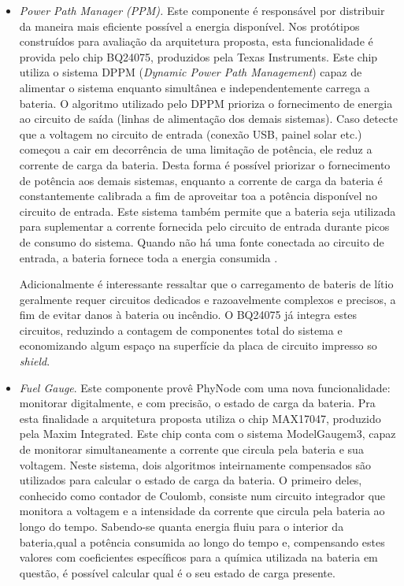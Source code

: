 \documentclass[
	12pt,				%
	openright,			%
	oneside,
	a4paper,			%
	english,			%
	french,				%
	spanish,			%
	brazil				%
	]{abntex2}
\begin{document}
\begin{itemize}
	\item \textit{Power Path Manager (PPM).} Este componente é responsável por distribuir da maneira mais eficiente possível a energia disponível. Nos protótipos construídos para avaliação da arquitetura proposta, esta funcionalidade é provida pelo chip BQ24075, produzidos pela Texas Instruments\texttrademark. Este chip utiliza o sistema DPPM (\textit{Dynamic Power Path Management}) capaz de alimentar o sistema enquanto simultânea e independentemente carrega a bateria. O algoritmo utilizado pelo DPPM prioriza o fornecimento de energia ao circuito de saída (linhas de alimentação dos demais sistemas). Caso detecte que a voltagem no circuito de entrada (conexão USB, painel solar etc.) começou a cair em decorrência de uma limitação de potência, ele reduz a corrente de carga da bateria. Desta forma é possível priorizar o fornecimento de potência aos demais sistemas, enquanto a corrente de carga da bateria é constantemente calibrada a fim de aproveitar toa a potência disponível no circuito de entrada. Este sistema também permite que a bateria seja utilizada para suplementar a corrente fornecida pelo circuito de entrada durante picos de consumo do sistema. Quando não há uma fonte conectada ao circuito de entrada, a bateria fornece toda a energia consumida \cite{TexasInstruments2014}.
	
	Adicionalmente é interessante ressaltar que o carregamento de bateris de lítio geralmente requer circuitos dedicados e razoavelmente complexos e precisos, a fim de  evitar danos à bateria ou incêndio. O BQ24075 já integra estes circuitos, reduzindo a contagem de componentes total do sistema e economizando algum espaço na superfície da placa de circuito impresso so \textit{shield}.
	\item \textit{Fuel Gauge}. Este componente provê PhyNode com uma nova funcionalidade: monitorar digitalmente, e com precisão, o estado de carga da bateria. Pra esta finalidade a arquitetura proposta utiliza o chip MAX17047, produzido pela Maxim Integrated\texttrademark. Este chip conta com o sistema ModelGauge\texttrademark m3, capaz de monitorar simultaneamente a corrente que circula pela bateria e sua voltagem. Neste sistema, dois algoritmos inteirnamente compensados são utilizados para calcular o estado de carga da bateria. O primeiro deles, conhecido como contador de Coulomb, consiste num circuito integrador que monitora a voltagem e a intensidade da corrente que circula pela bateria ao longo do tempo. Sabendo-se quanta energia fluiu para o interior da bateria,qual a potência consumida ao longo do tempo e, compensando estes valores com coeficientes específicos para a química utilizada na bateria em questão, é possível calcular qual é o seu estado de carga presente.
	

\end{itemize}
\end{document}

